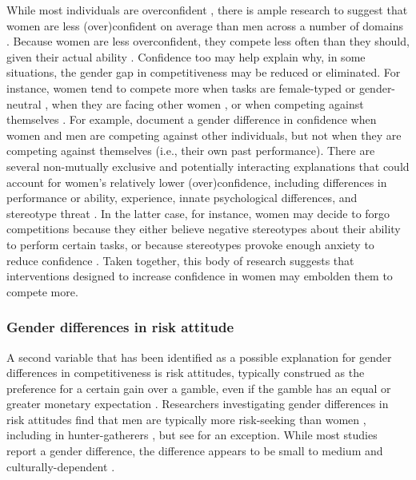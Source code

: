 \documentclass[a4paper, nobind]{templates/ociamthesis}
\begin{document}
While most individuals are overconfident \autocite{Alicke2013,Dunning2004b}, there is ample research to suggest that women are less (over)confident on average than men across a number of domains \autocites{Mobius2011,Niederle2011,Croson2009,Lundeberg1994,Niederle2007,Bertrand2010a,Beyer1990,Beyer1997,Jakobsson2013}[although see][]{Bandiera2022}. Because women are less overconfident, they compete less often than they should, given their actual ability \autocite{Niederle2007}. Confidence too may help explain why, in some situations, the gender gap in competitiveness may be reduced or eliminated. For instance, women tend to compete more when tasks are female-typed or gender-neutral \autocite{Iriberri2017,Boschini2014,Boschini2019,Apicella2015,Grosse2010,Gunther2010,Dreber2014,Dreber2011,Shurchkov2012}, when they are facing other women \autocite{DattaGupta2013,Booth2012}, or when competing against themselves \autocite{Apicella2017a,Bonte2018,Carpenter2018,Apicella2020}. For example, \textcite{Apicella2017a} document a gender difference in confidence when women and men are competing against other individuals, but not when they are competing against themselves (i.e., their own past performance). There are several non-mutually exclusive and potentially interacting explanations that could account for women's relatively lower (over)confidence, including differences in performance or ability, experience, innate psychological differences, and stereotype threat \autocite{Steele1997,Spencer1999,Spencer2016}. In the latter case, for instance, women may decide to forgo competitions because they either believe negative stereotypes about their ability to perform certain tasks, or because stereotypes provoke enough anxiety to reduce confidence \autocite{Gunther2010,Grosse2010,Iriberri2017,Shurchkov2012,Burow2017}. Taken together, this body of research suggests that interventions designed to increase confidence in women may embolden them to compete more.

\hypertarget{gender-differences-in-risk-attitude}{%
\subsubsection{Gender differences in risk attitude}\label{gender-differences-in-risk-attitude}}

A second variable that has been identified as a possible explanation for gender differences in competitiveness is risk attitudes, typically construed as the preference for a certain gain over a gamble, even if the gamble has an equal or greater monetary expectation \autocite{Kahneman1982}. Researchers investigating gender differences in risk attitudes find that men are typically more risk-seeking than women \autocite{Eckel2008,Charness2012,Croson2009,Bertrand2010a}, including in hunter-gatherers \autocite{Apicella2017}, but see \autocite{Harrison2007} for an exception. While most studies report a gender difference, the difference appears to be small to medium \autocite{Filippin2016} and culturally-dependent \autocite{Gneezy2009}.
\end{document}
